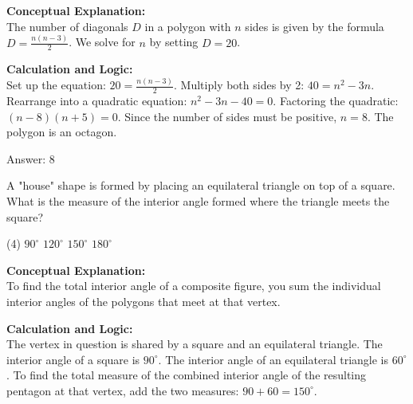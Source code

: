 \documentclass[11pt,paper=a4,answers]{exam}
\begin{document}
\begin{questions}
\begin{solution}
\textbf{Conceptual Explanation:} \\
The number of diagonals $D$ in a polygon with $n$ sides is given by the formula $D = \frac{n(n - 3)}{2}$. We solve for $n$ by setting $D = 20$.

\vspace{30pt}

\textbf{Calculation and Logic:} \\
Set up the equation: $20 = \frac{n(n - 3)}{2}$. Multiply both sides by 2: $40 = n^2 - 3n$. Rearrange into a quadratic equation: $n^2 - 3n - 40 = 0$. Factoring the quadratic: $(n - 8)(n + 5) = 0$. Since the number of sides must be positive, $n = 8$. The polygon is an octagon.

\vspace{30pt}

Answer: \colorbox{yellow!100}{8}
\end{solution}

\vspace{60pt}

\question
\begin{center}
\end{center}
A "house" shape is formed by placing an equilateral triangle on top of a square. What is the measure of the interior angle formed where the triangle meets the square?
\begin{tasks}(4)
    \task $90^\circ$
    \task $120^\circ$
    \task $150^\circ$
    \task $180^\circ$
\end{tasks}

\begin{solution}
\textbf{Conceptual Explanation:} \\
To find the total interior angle of a composite figure, you sum the individual interior angles of the polygons that meet at that vertex.

\vspace{30pt}

\textbf{Calculation and Logic:} \\
The vertex in question is shared by a square and an equilateral triangle. The interior angle of a square is $90^\circ$. The interior angle of an equilateral triangle is $60^\circ$. To find the total measure of the combined interior angle of the resulting pentagon at that vertex, add the two measures: $90 + 60 = 150^\circ$.


\end{solution}
\end{questions}
\end{document}
